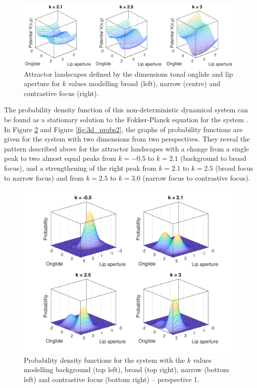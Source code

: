 \begin{figure}
\includegraphics[width=\textwidth]{figures/ch7/3d_landscapes2.pdf}
\caption[Attractor landscapes defined by the dimensions tonal onglide and lip aperture for broad, narrow and contrastive focus.]{Attractor landscapes defined by the dimensions tonal onglide and lip aperture for $k$ values modelling broad (left), narrow (centre) and contrastive focus (right).}
\label{fig:3d_landscapes2}
\end{figure}

The probability density function of this non-deterministic dynamical system can be found as a stationary solution to the Fokker-Planck equation for the system \citep{Haken1977, GafosBenus2006}. In Figure \ref{fig:3d_probs1} and Figure \ref{fig:3d_probs2}, the graphs of probability functions are given for the system with two dimensions from two perspectives. They reveal the pattern described above for the attractor landscapes with a change from a single peak to two almost equal peaks from $k = -0.5$ to $k = 2.1$ (background to broad focus), and a strengthening of the right peak from $k = 2.1$ to $k = 2.5$ (broad focus to narrow focus) and from $k = 2.5$ to $k = 3.0$ (narrow focus to contrastive focus). 

\begin{figure}
	\includegraphics[width=\textwidth]{figures/ch7/probabilities1.pdf}
	\caption[Probability density functions for the system with the $k$ values modelling background, broad, narrow and contrastive focus -- perspective 1.]{Probability density functions for the system with the $k$ values modelling background (top left), broad (top right), narrow (bottom left) and contrastive focus (bottom right) -- perspective 1.}
	\label{fig:3d_probs1}
\end{figure}

